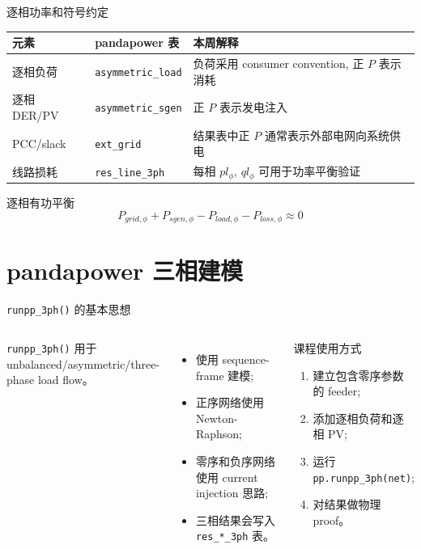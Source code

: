 \documentclass[aspectratio=169,10pt]{ctexbeamer}
\newcommand{\code}[1]{\texttt{#1}}
\begin{document}
\begin{frame}{逐相功率和符号约定}
\begin{tabular}{p{}p{}p{}}
\toprule
元素 & pandapower 表 & 本周解释 \\
\midrule
逐相负荷 & \code{asymmetric\_load} & 负荷采用 consumer convention, 正 $P$ 表示消耗 \\
逐相 DER/PV & \code{asymmetric\_sgen} & 正 $P$ 表示发电注入 \\
PCC/slack & \code{ext\_grid} & 结果表中正 $P$ 通常表示外部电网向系统供电 \\
线路损耗 & \code{res\_line\_3ph} & 每相 $pl_\phi$, $ql_\phi$ 可用于功率平衡验证 \\
\bottomrule
\end{tabular}
\vspace{0.8em}
\begin{block}{逐相有功平衡}
\[
P_{grid,\phi}+P_{sgen,\phi}-P_{load,\phi}-P_{loss,\phi}\approx 0
\]
\end{block}
\end{frame}

\section{pandapower 三相建模}

\begin{frame}{\texttt{runpp\_3ph()} 的基本思想}
\begin{columns}[T]
\code{runpp\_3ph()} 用于 unbalanced/asymmetric/three-phase load flow。
\begin{itemize}
  \item 使用 sequence-frame 建模;
  \item 正序网络使用 Newton-Raphson;
  \item 零序和负序网络使用 current injection 思路;
  \item 三相结果会写入 \code{res\_*\_3ph} 表。
\end{itemize}
\begin{block}{课程使用方式}
\begin{enumerate}
  \item 建立包含零序参数的 feeder;
  \item 添加逐相负荷和逐相 PV;
  \item 运行 \code{pp.runpp\_3ph(net)};
  \item 对结果做物理 proof。
\end{enumerate}
\end{block}
\end{columns}
\end{frame}
\end{document}
